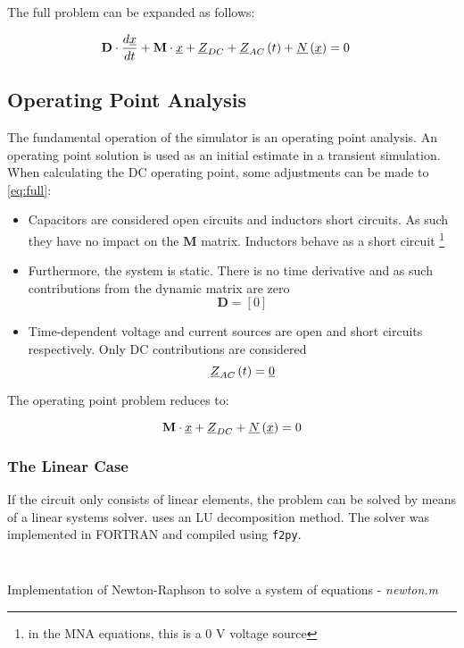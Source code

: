 The full problem can be expanded as follows:

\begin{align}
    &\mathbf{D}\cdot \frac{d\underline{x}}{dt} + \mathbf{M}\cdot \underline{x} + \underline{Z}_{DC} + \underline{Z}_{AC}\left( t\right) + \underline{N}\left(\underline{x}\right) = 0 \label{eq:full}
\end{align}

\subsection{Operating Point Analysis}
The fundamental operation of the simulator is an operating point analysis. An operating point solution is used as an initial estimate in a transient simulation. When calculating the DC operating point, some adjustments can be made to \cref{eq:full}:

\begin{itemize}
    \item Capacitors are considered open circuits and inductors short circuits. As such they have no impact on the $\mathbf{M}$ matrix. Inductors behave as a short circuit \footnote{in the MNA equations, this is a 0 V voltage source}
    \item Furthermore, the system is static. There is no time derivative and as such contributions from the dynamic matrix are zero \[\mathbf{D} = [0] \]
    \item Time-dependent voltage and current sources are open and short circuits respectively. Only DC contributions are considered \[ \underline{Z}_{AC}\left( t\right) = \underline{0}\]
\end{itemize}

The operating point problem reduces to:

\begin{equation}
    \mathbf{M}\cdot \underline{x} + \underline{Z}_{DC} + \underline{N}\left(\underline{x} \right) = 0 \label{eq:op problem}
\end{equation}

\subsubsection{The Linear Case}
If the circuit only consists of linear elements, the problem can be solved by means of a linear systems solver. \turmeric uses an LU decomposition method. The solver was implemented in FORTRAN and compiled using \texttt{f2py}.

\begin{listing*}[!p]
\inputminted[firstline=1, lastline=1, linenos=true]{octave}{lst/newton.m}
\inputminted[firstline=33, lastline=86, linenos=true]{octave}{lst/newton.m}
\caption{Implementation of Newton-Raphson to solve a system of equations - \textit{newton.m}}
\label{listing:newrap code}
\end{listing*}

